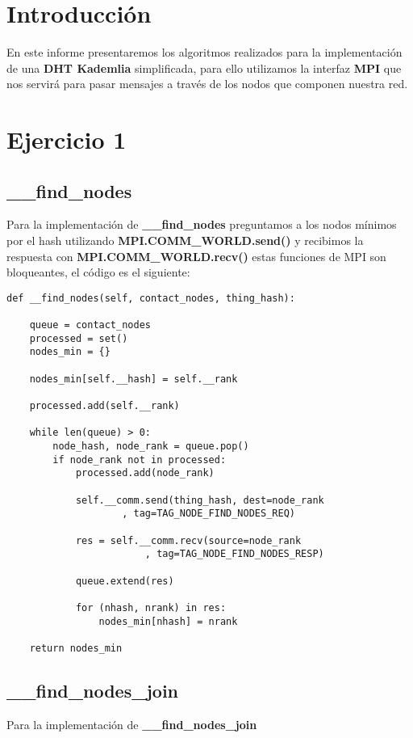\section{Introducción}
En este informe presentaremos los algoritmos realizados para la implementación de una \textbf{DHT Kademlia} simplificada, para ello utilizamos la interfaz \textbf{MPI} que nos servirá para pasar mensajes a través de los nodos que componen nuestra red.

\section{Ejercicio 1}

\subsection{\_\_find\_nodes}
Para la implementación de \textbf{\_\_find\_nodes} preguntamos a los nodos mínimos por el hash utilizando \textbf{MPI.COMM\_WORLD.send()} y recibimos la respuesta con \textbf{MPI.COMM\_WORLD.recv()} estas funciones de MPI son bloqueantes, el código es el siguiente:

\begin{lstlisting}
def __find_nodes(self, contact_nodes, thing_hash):

    queue = contact_nodes
    processed = set()
    nodes_min = {}

    nodes_min[self.__hash] = self.__rank

    processed.add(self.__rank)

    while len(queue) > 0:
        node_hash, node_rank = queue.pop()
        if node_rank not in processed:
            processed.add(node_rank)

            self.__comm.send(thing_hash, dest=node_rank
					, tag=TAG_NODE_FIND_NODES_REQ)

            res = self.__comm.recv(source=node_rank
						, tag=TAG_NODE_FIND_NODES_RESP)

            queue.extend(res)
            
            for (nhash, nrank) in res:
                nodes_min[nhash] = nrank

    return nodes_min
\end{lstlisting}


\subsection{\_\_find\_nodes\_join}
Para la implementación de \textbf{\_\_find\_nodes\_join} 


